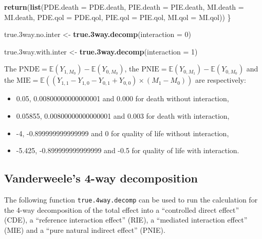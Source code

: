 \documentclass[
]{book}
\newenvironment{Shaded}{\begin{snugshade}}{\end{snugshade}}
\newcommand{\AttributeTok}[1]{\textcolor[rgb]{0.13,0.29,0.53}{#1}}
\newcommand{\DecValTok}[1]{\textcolor[rgb]{0.00,0.00,0.81}{#1}}
\newcommand{\FloatTok}[1]{\textcolor[rgb]{0.00,0.00,0.81}{#1}}
\newcommand{\FunctionTok}[1]{\textcolor[rgb]{0.13,0.29,0.53}{\textbf{#1}}}
\newcommand{\NormalTok}[1]{#1}
\newcommand{\OtherTok}[1]{\textcolor[rgb]{0.56,0.35,0.01}{#1}}
\providecommand{\tightlist}{%
  \setlength{\itemsep}{0pt}\setlength{\parskip}{0pt}}
\begin{document}
\begin{Shaded}
\begin{Highlighting}[]
  \FunctionTok{return}\NormalTok{(}\FunctionTok{list}\NormalTok{(}\AttributeTok{PDE.death =}\NormalTok{ PDE.death, }\AttributeTok{PIE.death =}\NormalTok{ PIE.death, }\AttributeTok{MI.death =}\NormalTok{ MI.death,}
              \AttributeTok{PDE.qol =}\NormalTok{ PDE.qol, }\AttributeTok{PIE.qol =}\NormalTok{ PIE.qol, }\AttributeTok{MI.qol =}\NormalTok{ MI.qol))}
\NormalTok{\}}
\end{Highlighting}
\end{Shaded}

\begin{Shaded}
\begin{Highlighting}[]
\NormalTok{true}\FloatTok{.3}\NormalTok{way.no.inter }\OtherTok{\textless{}{-}} \FunctionTok{true.3way.decomp}\NormalTok{(}\AttributeTok{interaction =} \DecValTok{0}\NormalTok{)}

\NormalTok{true}\FloatTok{.3}\NormalTok{way.with.inter }\OtherTok{\textless{}{-}} \FunctionTok{true.3way.decomp}\NormalTok{(}\AttributeTok{interaction =} \DecValTok{1}\NormalTok{)}
\end{Highlighting}
\end{Shaded}

The \(\text{PNDE}=\mathbb{E}\left( Y_{1,M_0}\right) - \mathbb{E}\left( Y_{0,M_0}\right)\), the \(\text{PNIE}=\mathbb{E}\left(Y_{0,M_1}\right) - \mathbb{E}\left(Y_{0,M_0}\right)\) and the \(\text{MIE}=\mathbb{E}\left( (Y_{1,1} - Y_{1,0} - Y_{0,1} + Y_{0,0}) \times (M_1 - M_0) \right)\) are respectively:

\begin{itemize}
\tightlist
\item
  0.05, 0.00800000000000001 and 0.000 for death without interaction,
\item
  0.05855, 0.00800000000000001 and 0.003 for death with interaction,
\item
  -4, -0.899999999999999 and 0 for quality of life without interaction,
\item
  -5.425, -0.899999999999999 and -0.5 for quality of life with interaction.
\end{itemize}

\subsection{Vanderweele's 4-way decomposition}\label{vanderweeles-4-way-decomposition}

The following function \texttt{true.4way.decomp} can be used to run the calculation for the 4-way decomposition of the total effect into a ``controlled direct effect'' (CDE), a ``reference interaction effect'' (RIE), a ``mediated interaction effect'' (MIE) and a ``pure natural indirect effect'' (PNIE).
\end{document}
